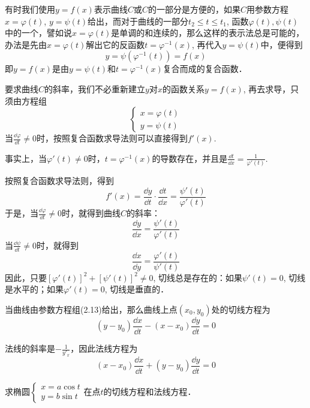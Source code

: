 有时我们使用$y=f(x)$表示曲线$C$或$C$的一部分是方便的，如果$C$用参数方程$x=\varphi(t)$, $y=\psi(t)$给出，而对于曲线的一部分$t_2\le t\le t_1$, 函数$\varphi(t),\psi(t)$中的一个，譬如说$x=\varphi(t)$是单调的和连续的，那么这样的表示法总是可能的，办法是先由$x=\varphi(t)$解出它的反函数$t=\varphi^{-1}(x)$, 再代入$y=\psi(t)$中，便得到
\[y=\psi\left(\varphi^{-1}(t)\right)=f(x)\]
即$y=f(x)$是由$y=\psi(t)$和$t=\varphi^{-1}(x)$复合而成的复合函数．

要求曲线$C$的斜率，我们不必重新建立$y$对$x$的函数关系$y=f(x)$, 再去求导，只须由方程组
\begin{equation}
    \begin{cases}
        x=\varphi(t)\\ y=\psi(t)
    \end{cases}
\end{equation}
当$\frac{\dd\varphi}{\dd t}\ne 0$时，按照复合函数求导法则可以直接得到$f'(x)$.

事实上，当$\varphi'(t)\ne 0$时，$t=\varphi^{-1}(x)$的导数存在，并且是$\frac{\dd t}{\dd 
x}=\frac{1}{\varphi'(t)}$.

按照复合函数求导法则，得到
\[f'(x)=\frac{\dd y}{\dd t}\cdot \frac{\dd t}{\dd x}=\frac{\psi'(t)}{\varphi'(t)}\]
于是，当$\frac{\dd\varphi}{\dd t}\ne 0$时，就得到曲线$C$的斜率：
\begin{equation}
    \frac{\dd y}{\dd x}=\frac{\psi'(t)}{\varphi'(t)}
\end{equation}
当$\frac{\dd\psi}{\dd t}\ne 0$时，就得到
\begin{equation}
    \frac{\dd x}{\dd y}=\frac{\varphi'(t)}{\psi'(t)}
\end{equation}
因此，只要$[\varphi'(t)]^2+[\psi'(t)]^2\ne 0$, 切线总是存在的：如果$\psi'(t)=0$, 切线是水平的；如果$\varphi'(t)=0$, 切线是垂直的．

当曲线由参数方程组(2.13)给出，那么曲线上点$(x_0,y_0)$处的切线方程为
\begin{equation}
    (y-y_0)\frac{\dd x}{\dd t}-(x-x_0)\frac{\dd y}{\dd t}=0
\end{equation}

法线的斜率是$-\frac{1}{y'_x}$，因此法线方程为
\begin{equation}
    (x-x_0)\frac{\dd x}{\dd t}+(y-y_0)\frac{\dd y}{\dd t}=0
\end{equation}

\begin{example}
求椭圆$\begin{cases}
    x=a\cos t\\ y=b\sin t
\end{cases}$在点$t$的切线方程和法线方程．
\end{example}




